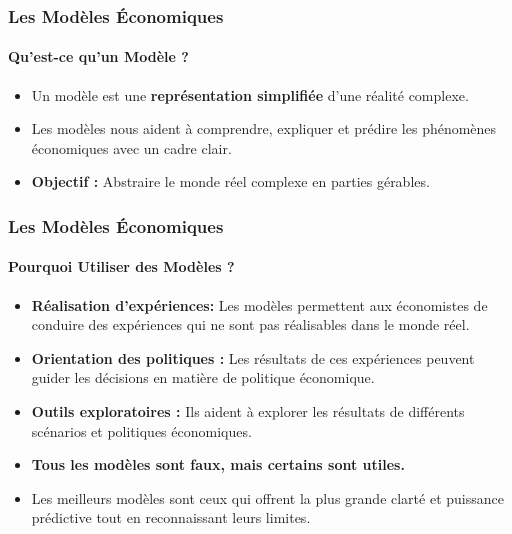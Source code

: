 \documentclass{beamer}
\begin{document}
\begin{frame}
    \frametitle{Les Modèles Économiques}
    \framesubtitle{Qu'est-ce qu'un Modèle ?}
        \begin{itemize}
            \item Un modèle est une \textbf{représentation simplifiée} d'une réalité complexe.
            \item Les modèles nous aident à comprendre, expliquer et prédire les phénomènes économiques avec un cadre clair.
            \item \textbf{Objectif :} Abstraire le monde réel complexe en parties gérables.
        \end{itemize}
    \end{frame}
    \begin{frame}
        \frametitle{Les Modèles Économiques}
        \framesubtitle{Pourquoi Utiliser des Modèles ?}
        \begin{itemize}
            \item \textbf{Réalisation d'expériences:} Les modèles permettent aux économistes de conduire des expériences qui ne sont pas réalisables dans le monde réel.
            \item \textbf{Orientation des politiques :} Les résultats de ces expériences peuvent guider les décisions en matière de politique économique.
            \item \textbf{Outils exploratoires :} Ils aident à explorer les résultats de différents scénarios et politiques économiques.
            \item \textbf{Tous les modèles sont faux, mais certains sont utiles.}
            \item Les meilleurs modèles sont ceux qui offrent la plus grande clarté et puissance prédictive tout en reconnaissant leurs limites.
        \end{itemize}
    \end{frame}
    
\end{document}
